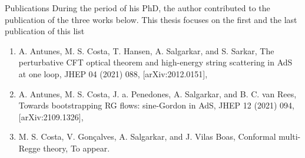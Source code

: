 \documentclass[11pt, twoside,hidelinks]{Thesis}
\newcommand{\dDisc}{\text{dDisc}}
\begin{document}
  
  


\begin{frontchapter}{Publications} \label{Publications}
During the period of his PhD, the author contributed to the publication of the three works
below.
This thesis focuses on the first and the last publication of this list
\begin{enumerate}
  \item A. Antunes, M. S. Costa, T. Hansen, A. Salgarkar, and S. Sarkar, The perturbative CFT optical
theorem and high-energy string scattering in AdS at one loop, JHEP 04 (2021) 088,
[arXiv:2012.0151],
\item 
A. Antunes, M. S. Costa, J. a. Penedones, A. Salgarkar, and B. C. van Rees, Towards
bootstrapping RG flows: sine-Gordon in AdS, JHEP 12 (2021) 094, [arXiv:2109.1326],
\item 
M. S. Costa, V. Gon\c{c}alves, A. Salgarkar, and J. Vilas Boas, 
Conformal multi-Regge theory, To appear.
\end{enumerate}

\end{frontchapter}
\end{document}

